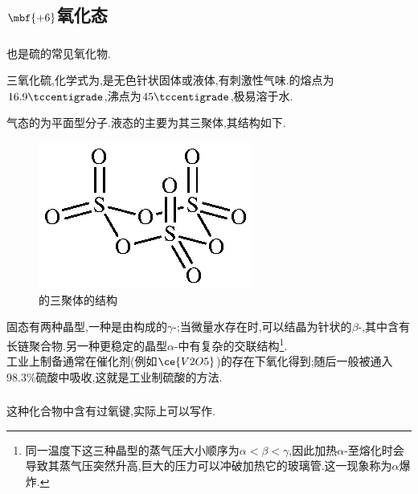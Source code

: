 \documentclass{ctexart}
\begin{document}
\subsection{$\mbf{+6}$氧化态}
\subsubsection{}
也是硫的常见氧化物.
\begin{substance}[\ce{SO3}]
    三氧化硫,化学式为,是无色针状固体或液体,有刺激性气味.的熔点为$16.9\tccentigrade$,沸点为$45\tccentigrade$,极易溶于水.
\end{substance}
气态的为平面型分子.液态的主要为其三聚体,其结构如下.
\begin{figure}[H]
    \centering\includegraphics{picture/S3O9.eps}
    \caption{的三聚体的结构}
\end{figure}
固态有两种晶型,一种是由构成的$\gamma$-;当微量水存在时,可以结晶为针状的$\beta$-,其中含有长链聚合物.另一种更稳定的晶型$\alpha$-中有复杂的交联结构\footnote{同一温度下这三种晶型的蒸气压大小顺序为$\alpha<\beta<\gamma$,因此加热$\alpha$-至熔化时会导致其蒸气压突然升高,巨大的压力可以冲破加热它的玻璃管.这一现象称为$\alpha$爆炸.}.\\
\indent 工业上制备通常在催化剂(例如$\ce{V2O5}$)的存在下氧化得到;随后一般被通入$98.3\%$硫酸中吸收,这就是工业制硫酸的方法.
\subsubsection{}
这种化合物中含有过氧键,实际上可以写作.
\end{document}
